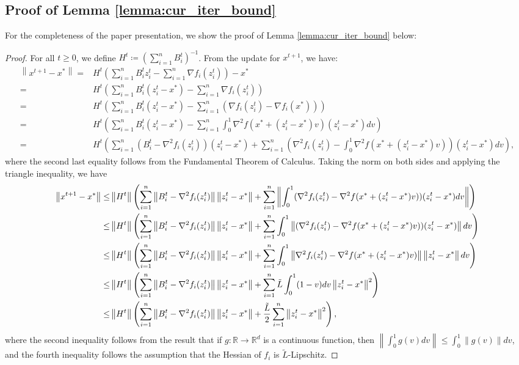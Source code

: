 \documentclass[letterpaper]{article} %
\theoremstyle{plain}
\theoremstyle{definition}
\theoremstyle{remark}
\newcommand\norm[1]{\left\lVert#1\right\rVert}
\def\BR{{\mathbb{R}}}
\begin{document}
\subsection{Proof of Lemma \ref{lemma:cur_iter_bound}}
For the completeness of the paper presentation, we show the proof of Lemma \ref{lemma:cur_iter_bound} below:
\begin{proof}
    For all $t \geq 0$, we define $H^t \coloneqq (\sum_{i=1}^n B_i^t)^{-1}$. From the update for $x^{t+1}$, we have:
    \begin{align*}
        \norm{x^{t+1} - x^*} =& H^t \left( \sum_{i=1}^n B_i^t z_i^t - \sum_{i=1}^n \nabla f_i(z_i^t) \right) - x^* \\
         = & H^{t} \left( \sum_{i=1}^n B_i^{t} (z_i^t - x^*) - \sum_{i=1}^n \nabla f_i(z_i^t) \right) \\
         = & H^{t} \left( \sum_{i=1}^n B_i^{t} (z_i^t - x^*) - \sum_{i=1}^n (\nabla f_i(z_i^t) - \nabla f_i(x^*))\right) \\
        = &  H^{t} \left( \sum_{i=1}^n B_i^{t} (z_i^t - x^*) - \sum_{i=1}^n \int_0^1\nabla^2 f(x^* + (z_i^t - x^*)v) (z_i^t - x^*) d v \right) \\
        = &  H^{t} \left( \sum_{i=1}^n (B_i^{t} - \nabla^2 f_i(z_i^t)) (z_i^t - x^*) + \sum_{i=1}^n (\nabla^2 f_i (z_i^t) - \int_0^1\nabla^2 f(x^* + (z_i^t - x^*)v) ) (z_i^t - x^*) d v \right),
    \end{align*}
    where the second last equality follows from the Fundamental Theorem of Calculus. Taking the norm on both sides and applying the triangle inequality, we have
    \begin{align*}
        \norm{x^{t+1} - x^*} \leq & \norm{H^{t}} \left( \sum_{i=1}^n \norm{B_i^{t} - \nabla^2 f_i(z_i^t)} \norm{z_i^t - x^*} + \sum_{i=1}^n \norm{\int_0^1 (\nabla^2 f_i (z_i^t) - \nabla^2 f(x^* + (z_i^t - x^*)v))  (z_i^t - x^*) d v } \right) \\
        \leq & \norm{H^{t}} \left( \sum_{i=1}^n \norm{B_i^{t} - \nabla^2 f_i(z_i^t)} \norm{z_i^t - x^*} + \sum_{i=1}^n \int_0^1 \norm{(\nabla^2 f_i (z_i^t) - \nabla^2 f(x^* + (z_i^t - x^*)v))  (z_i^t - x^*)} d v   \right) \\
        \leq & \norm{H^{t}} \left( \sum_{i=1}^n \norm{B_i^{t} - \nabla^2 f_i(z_i^t)} \norm{z_i^t - x^*} + \sum_{i=1}^n \int_0^1 \norm{\nabla^2 f_i (z_i^t) - \nabla^2 f(x^* + (z_i^t - x^*)v)}  \norm{z_i^t - x^*} d v   \right) \\
        \leq & \norm{H^{t}} \left( \sum_{i=1}^n \norm{B_i^{t} - \nabla^2 f_i(z_i^t)} \norm{z_i^t - x^*} + \sum_{i=1}^n \Tilde{L} \int_0^1 (1 - v) d v \norm{z_i^t - x^*}^2   \right) \\
        \leq & \norm{H^{t}} \left( \sum_{i=1}^n \norm{B_i^{t} - \nabla^2 f_i(z_i^t)} \norm{z_i^t - x^*} + \frac{\Tilde{L}}{2} \sum_{i=1}^n   \norm{z_i^t - x^*}^2   \right),
    \end{align*}
    where the second inequality follows from the result that if $g: \BR \to \BR^d$ is a continuous function, then $\norm{\int_0^1 g(v) d v} \leq \int_0^1 \norm{g(v)} d v$, and the fourth inequality follows the assumption that the Hessian of $f_i$ is $\tilde{L}$-Lipschitz.
\end{proof}
\end{document}
